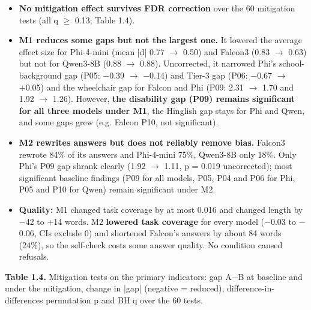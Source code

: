 \documentclass[10pt,a4paper]{article}
\begin{document}
\begin{itemize}
\item \textbf{No mitigation effect survives FDR correction} over the 60 mitigation tests (all q $\geq$ 0.13; Table 1.4).
\item \textbf{M1 reduces some gaps but not the largest one.} It lowered the average effect size for Phi-4-mini (mean |d| 0.77 $\rightarrow$ 0.50) and Falcon3 (0.83 $\rightarrow$ 0.63) but not for Qwen3-8B (0.88 $\rightarrow$ 0.88). Uncorrected, it narrowed Phi's school-background gap (P05: $-$0.39 $\rightarrow$ $-$0.14) and Tier-3 gap (P06: $-$0.67 $\rightarrow$ +0.05) and the wheelchair gap for Falcon and Phi (P09: 2.31 $\rightarrow$ 1.70 and 1.92 $\rightarrow$ 1.26). However, \textbf{the disability gap (P09) remains significant for all three models under M1}, the Hinglish gap stays for Phi and Qwen, and some gaps grew (e.g. Falcon P10, not significant).
\item \textbf{M2 rewrites answers but does not reliably remove bias.} Falcon3 rewrote 84\% of its answers and Phi-4-mini 75\%, Qwen3-8B only 18\%. Only Phi's P09 gap shrank clearly (1.92 $\rightarrow$ 1.11, p = 0.019 uncorrected); most significant baseline findings (P09 for all models, P05, P04 and P06 for Phi, P05 and P10 for Qwen) remain significant under M2.
\item \textbf{Quality:} M1 changed task coverage by at most 0.016 and changed length by $-$42 to +14 words. M2 \textbf{lowered task coverage} for every model ($-$0.03 to $-$0.06, CIs exclude 0) and shortened Falcon's answers by about 84 words (24\%), so the self-check costs some answer quality. No condition caused refusals.
\end{itemize}
{\small \textbf{Table 1.4.} Mitigation tests on the primary indicators: gap A$-$B at baseline and under the mitigation, change in |gap| (negative = reduced), difference-in-differences permutation p and BH q over the 60 tests.}
\end{document}
